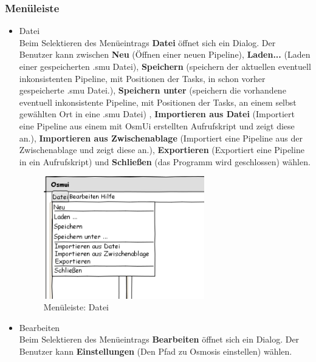\documentclass[a4paper,12pt]{scrartcl}
\begin{document}
\subsubsection{Menüleiste}
\begin{itemize}
\item Datei\\
Beim Selektieren des Menüeintrags \textbf{Datei} öffnet sich ein Dialog. Der Benutzer kann zwischen \textbf{Neu} (Öffnen einer neuen Pipeline), \textbf{Laden...} (Laden einer gespeicherten .smu Datei), \textbf{Speichern} (speichern der aktuellen eventuell inkonsistenten Pipeline, mit Positionen der Tasks, in schon vorher gespeicherte .smu Datei.), \textbf{Speichern unter} (speichern die vorhandene eventuell inkonsistente Pipeline, mit Positionen der Tasks, an einem selbst gewählten Ort in eine .smu Datei) , \textbf{Importieren aus Datei} (Importiert eine Pipeline aus einem mit OsmUi erstellten Aufrufskript und zeigt diese an.), \textbf{Importieren aus Zwischenablage} (Importiert eine Pipeline aus der Zwischenablage und zeigt diese an.), \textbf{Exportieren} (Exportiert eine Pipeline in ein Aufrufskript) und \textbf{Schließen} (das Programm wird geschlossen) wählen. 
\\ 
\begin{center}
\begin{figure}[h!]
\begin{center}
\includegraphics[width=7cm]{ui_prototype/OsmUi_Dateiklein.png}
\caption{Menüleiste: Datei}
\end{center}
\end{figure}
\end{center}
\item Bearbeiten\\
Beim Selektieren des Menüeintrags \textbf{Bearbeiten} öffnet sich ein Dialog. Der Benutzer kann \textbf{Einstellungen} (Den Pfad zu Osmosis einstellen) wählen.
\\
\begin{center}
\begin{figure}[h!]

\end{figure}
\end{center}
\end{itemize}
\end{document}
